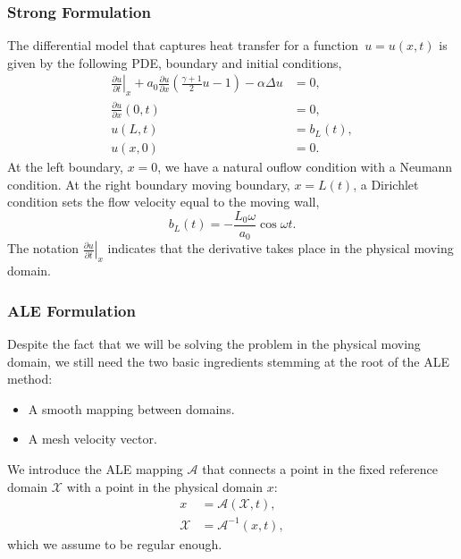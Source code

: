 \documentclass[../main.tex]{subfiles}
\newcommand{\alemap}{\ensuremath{\mathcal{A}}}
\newcommand{\aleX}{\ensuremath{\mathcal{X}}}
\begin{document}
\subsubsection{Strong Formulation}
The differential model that captures heat transfer for a function~$u = u(x,t)$ is given by the following PDE, boundary and initial conditions,
\begin{subequations}
    \begin{align}
        \left.\frac{\partial u}{\partial t}\right|_{x} + a_0 \frac{\partial u}{\partial x}\left(\frac{\gamma+1}{2}u - 1\right) - \alpha \Delta u &= 0, \label{eq:1d_fom_strong_pde}\\
        \frac{\partial u}{\partial x}(0, t) &= 0, \\
        u(L, t) &= b_L(t), \\
        u(x, 0) &= 0.
    \end{align}
\end{subequations}
At the left boundary, $x=0$, we have a natural ouflow condition with a Neumann condition.
At the right boundary moving boundary, $x=L(t)$, a Dirichlet condition sets the flow velocity equal to the moving wall,
\begin{equation}
    b_L(t) = -\frac{L_0 \omega}{a_0} \cos \omega t.
\end{equation}
The notation $\left.\frac{\partial u}{\partial t}\right|_{x}$ indicates that the derivative takes place in the physical moving domain. 

\subsubsection{ALE Formulation}
Despite the fact that we will be solving the problem in the physical moving domain, 
we still need the two basic ingredients stemming at the root of the ALE method:
\begin{itemize}
    \item A smooth mapping between domains.
    \item A mesh velocity vector.
\end{itemize}

We introduce the ALE mapping $\alemap$ that connects a point in the fixed reference domain $\mathcal{X}$ with a point in the physical domain $x$:
\begin{subequations}
    \begin{align}
        x &= \alemap(\aleX, t), \\
        \aleX &= \alemap^{-1}(x, t),
    \end{align}
\end{subequations}
which we assume to be regular enough.
\end{document}
